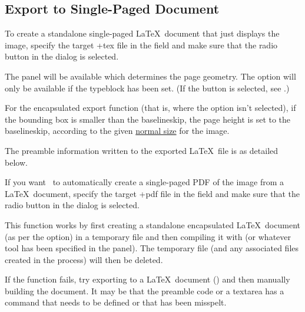 \subsection{Export to Single-Paged Document}\label{sec:exportdoc}


To create a standalone single-paged \LaTeX\ document that just
displays the image, specify the target \ext+{tex} file in the
 field and make sure that the
 radio button in the  dialog
is selected.

The  panel will be available which determines
the page geometry.  The  option will
only be available if the \gls{typeblock} has been set.  (If the
 button is selected, see
.)

\begin{information}
For the encapsulated export function (that is, where the
 option isn't selected),
if the bounding box is smaller than the baselineskip, the page
height is set to the baselineskip, according to the given
\hyperref[sec:normalsize]{normal size} for the image.
\end{information}

The preamble information written to the exported \LaTeX\ file is as detailed below.


If you want \FlowframTk\ to automatically create a single-paged PDF 
of the image from a \LaTeX\ document, specify the target \ext+{pdf} file in the
 field and make sure that the
 radio button in the  dialog
is selected.

This function works by first creating a standalone encapsulated
\LaTeX\ document (as per the  option) 
in a temporary file and then compiling it with
 (or whatever tool has been specified in the
 panel). The temporary file (and any
associated files created in the process) will then be deleted.

\begin{information}
If the  function fails, try exporting to a
\LaTeX\ document () and then manually
building the document. It may be that the preamble code or 
a \gls{textarea} has a command that needs to be defined or that has
been misspelt.
\end{information}

